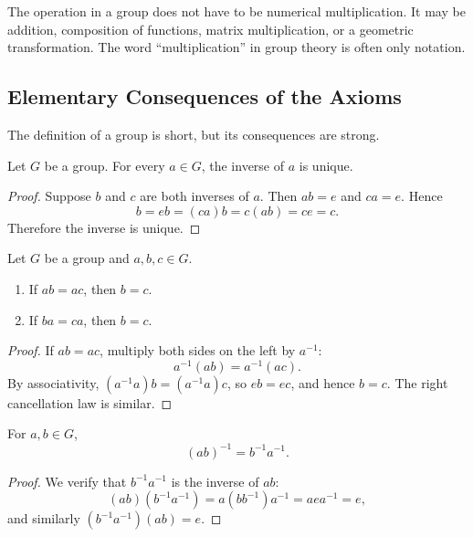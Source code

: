 \begin{remark}
The operation in a group does not have to be numerical multiplication. It may be addition, composition of functions, matrix multiplication, or a geometric transformation. The word ``multiplication'' in group theory is often only notation.
\end{remark}

\subsection{Elementary Consequences of the Axioms}

The definition of a group is short, but its consequences are strong.

\begin{proposition}
Let $G$ be a group. For every $a\in G$, the inverse of $a$ is unique.
\end{proposition}

\begin{proof}
Suppose $b$ and $c$ are both inverses of $a$. Then $ab=e$ and $ca=e$. Hence
\[
    b=eb=(ca)b=c(ab)=ce=c.
\]
Therefore the inverse is unique.
\end{proof}

\begin{proposition}
Let $G$ be a group and $a,b,c\in G$.
\begin{enumerate}
    \item If $ab=ac$, then $b=c$.
    \item If $ba=ca$, then $b=c$.
\end{enumerate}
\end{proposition}

\begin{proof}
If $ab=ac$, multiply both sides on the left by $a^{-1}$:
\[
    a^{-1}(ab)=a^{-1}(ac).
\]
By associativity, $(a^{-1}a)b=(a^{-1}a)c$, so $eb=ec$, and hence $b=c$. The right cancellation law is similar.
\end{proof}

\begin{proposition}
For $a,b\in G$,
\[
    (ab)^{-1}=b^{-1}a^{-1}.
\]
\end{proposition}

\begin{proof}
We verify that $b^{-1}a^{-1}$ is the inverse of $ab$:
\[
    (ab)(b^{-1}a^{-1})=a(bb^{-1})a^{-1}=aea^{-1}=e,
\]
and similarly $(b^{-1}a^{-1})(ab)=e$.
\end{proof}

